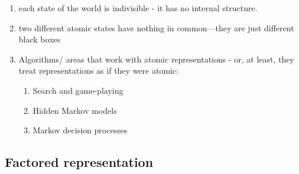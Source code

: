 \begin{enumerate}
    \item each state of the world is indivisible - it has no internal structure.
    \hfill \cite{ai/book/Artificial-Intelligence-A-Modern-Approach/Russell-Norvig}

    \item two different atomic states have nothing in common—they are just different black boxes
    \hfill \cite{ai/book/Artificial-Intelligence-A-Modern-Approach/Russell-Norvig}

    \item Algorithms/ areas that work with atomic representations - or, at least, they treat representations as if they were atomic:
    \begin{enumerate}
        \item Search and game-playing
        \hfill \cite{ai/book/Artificial-Intelligence-A-Modern-Approach/Russell-Norvig}

        \item Hidden Markov models
        \hfill \cite{ai/book/Artificial-Intelligence-A-Modern-Approach/Russell-Norvig}

        \item Markov decision processes
        \hfill \cite{ai/book/Artificial-Intelligence-A-Modern-Approach/Russell-Norvig}
    \end{enumerate}
\end{enumerate}



\subsection{Factored representation}

